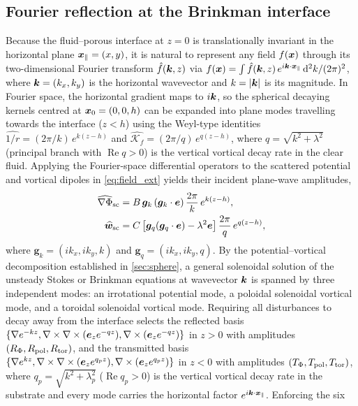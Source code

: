 \subsection{Fourier reflection at the Brinkman interface}\label{sec:reflection}
Because the fluid--porous interface at $z=0$ is translationally invariant in the horizontal plane $\bm{x}_\parallel=(x,y)$, it
is natural to represent any field $f(\bm{x})$ through its two-dimensional Fourier transform $\hat f(\bm{k},z)$ via
$f(\bm{x})=\int\hat f(\bm{k},z)\,e^{i\bm{k}\cdot\bm{x}_\parallel}\,\mathrm{d}^2k/(2\pi)^2$, where $\bm{k}=(k_x,k_y)$ is the horizontal
wavevector and $k=|\bm{k}|$ is its magnitude. In Fourier space, the horizontal gradient maps to $i\bm{k}$, so the spherical
decaying kernels centred at $\bm{x}_0=(0,0,h)$ can be expanded into plane modes travelling towards the interface ($z<h$)
using the Weyl-type identities $\widehat{1/r}=(2\pi/k)\,e^{k(z-h)}$ and $\widehat{\mathcal K_f}=(2\pi/q)\,e^{q(z-h)}$,
where $q=\sqrt{k^2+\lambda^2}$ (principal branch with $\operatorname{Re}q>0$) is the vertical vortical decay rate in the
clear fluid. Applying the Fourier-space differential operators to the scattered potential and vortical dipoles in
\cref{eq:field_ext} yields their incident plane-wave amplitudes,
\begin{subequations}\label{eq:incident_fourier}
\begin{align}
  \widehat{\nabla\Phi}_{\rm sc}&=B\,\bm g_k\,(\bm g_k\cdot\bm{e})\,\frac{2\pi}{k}\,e^{k(z-h)},\\
  \widehat{\bm w}_{\rm sc}&=C\left[\bm g_q(\bm g_q\cdot\bm{e})-\lambda^2\bm{e}\right]\frac{2\pi}{q}\,e^{q(z-h)},
\end{align}
\end{subequations}
where $\bm g_k=(ik_x,ik_y,k)$ and $\bm g_q=(ik_x,ik_y,q)$. By the potential--vortical decomposition established in
\cref{sec:sphere}, a general solenoidal solution of the unsteady Stokes or Brinkman equations at wavevector $\bm{k}$ is
spanned by three independent modes: an irrotational potential mode, a poloidal solenoidal vortical mode, and a toroidal
solenoidal vortical mode. Requiring all disturbances to decay away from the interface selects the reflected basis
$\{\nabla e^{-kz},\nabla\times\nabla\times(\bm{e}_ze^{-qz}),\nabla\times(\bm{e}_ze^{-qz})\}$ in $z>0$ with amplitudes
$(R_\Phi,R_{\rm pol},R_{\rm tor})$, and the transmitted basis
$\{\nabla e^{kz},\nabla\times\nabla\times(\bm{e}_ze^{q_pz}),\nabla\times(\bm{e}_ze^{q_pz})\}$ in $z<0$ with amplitudes
$(T_\Phi,T_{\rm pol},T_{\rm tor})$, where $q_p=\sqrt{k^2+\lambda_p^2}$ ($\operatorname{Re}q_p>0$) is the vertical vortical
decay rate in the substrate and every mode carries the horizontal factor $e^{i\bm{k}\cdot\bm{x}_\parallel}$. Enforcing the six

